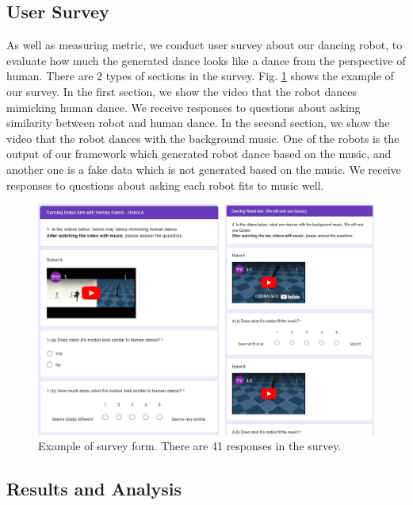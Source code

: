 \documentclass[letterpaper, 10 pt, conference]{ieeeconf}  %
\begin{document}
\subsection{User Survey}
As well as measuring metric, we conduct user survey about our dancing robot, to evaluate how much the generated dance looks like a dance from the perspective of human. There are 2 types of sections in the survey. Fig. \ref{fig:survey_form} shows the example of our survey. In the first section, we show the video that the robot dances mimicking human dance. We receive responses to questions about asking similarity between robot and human dance. In the second section, we show the video that the robot dances with the background music. One of the robots is the output of our framework which generated robot dance based on the music, and another one is a fake data which is not generated based on the music. We receive responses to questions about asking each robot fits to music well.

\begin{figure}[h]
    \centering
    \includegraphics[width=\linewidth]{figures/figure_survey.jpg}
    \caption{Example of survey form. There are 41 responses in the survey.}\label{fig:survey_form}
\end{figure}


\subsection{Results and Analysis}
\end{document}
